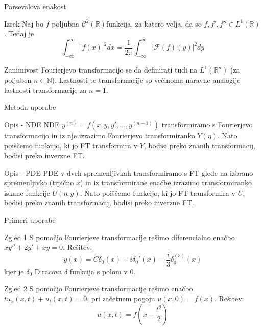 \documentclass[t, 8pt]{beamer} %
\newcommand{\abs}[1]{\ensuremath{\lvert #1 \rvert}}
\newcommand{\mth}[1]{\ensuremath{\mathbb{#1}}}
\newcommand{\R}{\mth{R}}
\newcommand{\N}{\mth{N}}
\begin{document}
		\begin{frame}{Parsevalova enakost}
			\begin{block}{Izrek}
				Naj bo $f$ poljubna $\mathcal{C}^2(\R)$funkcija, za katero velja, da so $f, f', f''\in L^1(\R)$. Tedaj je $$\int_{-\infty}^{\infty}\abs{f(x)}^2dx = \frac{1}{2\pi}\int_{-\infty}^{\infty}\abs{\mathcal{F}(f)(y)}^2dy$$
			\end{block}
			\begin{block}{Zanimivost}
				Fourierjevo transformacijo se da definirati tudi na $L^1(\R^n)$ (za poljuben $n\in\N$). Lastnosti te transformacije so večinoma naravne analogije lastnosti transformacije za $n = 1$.
			\end{block}
		\end{frame}
		
		\begin{frame}{Metoda uporabe}
			\begin{block}{Opis - NDE}
				NDE $y^{(n)} = f(x, y, y', \ldots, y^{(n-1)})$ transformiramo s Fourierjevo transformacijo in iz nje izrazimo Fourierjevo transformiranko $Y(\eta)$. Nato poiščemo funkcijo, ki jo FT transformira v $Y$, bodisi preko znanih transformacij, bodisi preko inverzne FT.
			\end{block}
			\begin{block}{Opis - PDE}
				PDE v dveh spremenljivkah transformiramo s FT glede na izbrano spremenljivko (tipično $x$) in iz transformirane enačbe izrazimo transformiranko iskane funkcije $U(\eta, y)$. Nato poiščemo funkcijo, ki jo FT transformira v $U$, bodisi preko znanih transformacij, bodisi preko inverzne FT.
			\end{block}
		\end{frame}
		
		\begin{frame}{Primeri uporabe}
			\begin{block}{Zgled 1}
				S pomočjo Fourierjeve transformacije rešimo diferencialno enačbo $xy'' + 2y' + xy = 0$.
				Rešitev: $$y(x) = C\delta_0(x) - i\delta_0'(x) - \frac{i}{3}\delta_0^{(3)}(x)$$ kjer je $\delta_0$ Diracova $\delta$ funkcija s polom v $0$.
			\end{block}
			\begin{block}{Zgled 2}
				S pomočjo Fourierjeve transformacije rešimo enačbo $tu_x(x, t) + u_t(x, t) = 0$, pri začetnem pogoju $u(x, 0) = f(x)$. Rešitev: $$u(x, t) = f(x-\frac{t^2}{2})$$
			\end{block}
		\end{frame}
		
\end{document}
